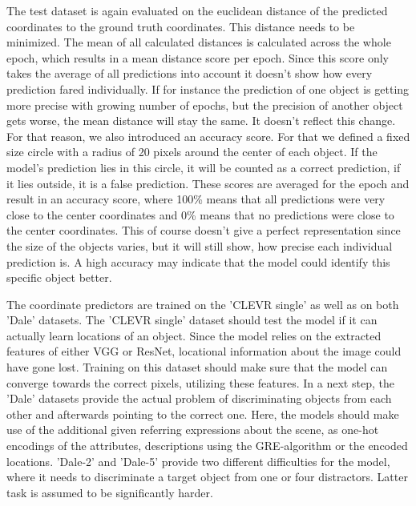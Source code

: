 The test dataset is again evaluated on the euclidean distance of the predicted coordinates to the ground truth coordinates.
This distance needs to be minimized.
The mean of all calculated distances is calculated across the whole epoch, which results in a mean distance score per epoch.
Since this score only takes the average of all predictions into account it doesn't show how every prediction fared individually.
If for instance the prediction of one object is getting more precise with growing number of epochs, but the precision of another object gets worse, the mean distance will stay the same.
It doesn't reflect this change.
For that reason, we also introduced an accuracy score.
For that we defined a fixed size circle with a radius of 20 pixels around the center of each object.
If the model's prediction lies in this circle, it will be counted as a correct prediction, if it lies outside, it is a false prediction.
These scores are averaged for the epoch and result in an accuracy score, where 100\% means that all predictions were very close to the center coordinates and 0\% means that no predictions were close to the center coordinates.
This of course doesn't give a perfect representation since the size of the objects varies, but it will still show, how precise each individual prediction is.
A high accuracy may indicate that the model could identify this specific object better.

The coordinate predictors are trained on the 'CLEVR single' as well as on both 'Dale' datasets.
The 'CLEVR single' dataset should test the model if it can actually learn locations of an object.
Since the model relies on the extracted features of either VGG or ResNet, locational information about the image could have gone lost.
Training on this dataset should make sure that the model can converge towards the correct pixels, utilizing these features.
In a next step, the 'Dale' datasets provide the actual problem of discriminating objects from each other and afterwards pointing to the correct one.
Here, the models should make use of the additional given referring expressions about the scene, as one-hot encodings of the attributes, descriptions using the GRE-algorithm or the encoded locations.
'Dale-2' and 'Dale-5' provide two different difficulties for the model, where it needs to discriminate a target object from one or four distractors.
Latter task is assumed to be significantly harder.

